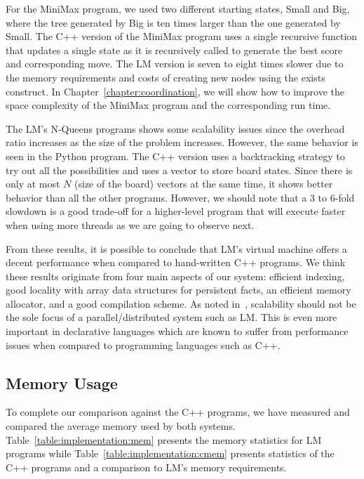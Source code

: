 For the MiniMax program, we used two different starting states, Small and Big,
where the tree generated by Big is ten times larger than the one generated by
Small. The C++ version of the MiniMax program uses a single recursive function
that updates a single state as it is recursively called to generate the best
score and corresponding move. The LM version is seven to eight times slower due
to the memory requirements and costs of creating new nodes using the exists
construct. In Chapter~\ref{chapter:coordination}, we will show how to improve
the space complexity of the MiniMax program and the corresponding run time.

The LM's N-Queens programs shows some scalability issues since the overhead
ratio increases as the size of the problem increases. However, the same behavior
is seen in the Python program. The C++ version uses a backtracking strategy to
try out all the possibilities and uses a vector to store board states.  Since
there is only at most $N$ (size of the board) vectors at the same time, it shows
better behavior than all the other programs. However, we should note that a 3 to
6-fold slowdown is a good trade-off for a higher-level program that will execute
faster when using more threads as we are going to observe next.

From these results, it is possible to conclude that LM's virtual machine offers
a decent performance when compared to hand-written C++ programs. We think these
results originate from four main aspects of our system: efficient indexing, good
locality with array data structures for persistent facts, an efficient memory
allocator, and a good compilation scheme. As noted in~\cite{cost}, scalability
should not be the sole focus of a parallel/distributed system such as LM. This
is even more important in declarative languages which are known to suffer from
performance issues when compared to programming languages such as C++.

\subsection{Memory Usage}

To complete our comparison against the C++ programs, we have measured and
compared the average memory used by both systems.
Table~\ref{table:implementation:mem} presents the memory statistics for LM
programs while Table~\ref{table:implementation:cmem} presents statistics of the
C++ programs and a comparison to LM's memory requirements.


